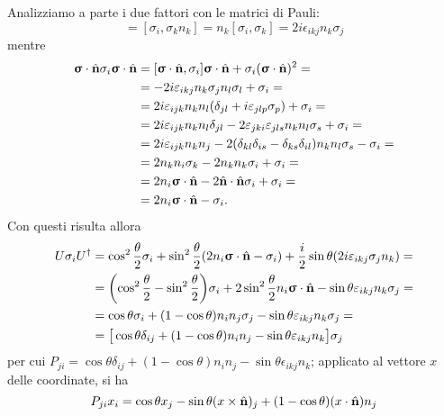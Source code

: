 Analizziamo a parte i due fattori con le matrici di Pauli:
\begin{equation}
	[\sigma_i,\scalar{\vsigma}{\axis}]=[\sigma_i,\sigma_kn_k]=n_k[\sigma_i,\sigma_k]=2i\epsilon_{ikj}n_k\sigma_j
\end{equation}
mentre
\begin{equation}
	\begin{split}
		{\bm{\upsigma}}\cdot{\hat{\mathbf{n}}}\sigma_i{\bm{\upsigma}}\cdot{\hat{\mathbf{n}}}&=[{\bm{\upsigma}}\cdot{\hat{\mathbf{n}}},\sigma_i]{\bm{\upsigma}}\cdot{\hat{\mathbf{n}}}+\sigma_i({\bm{\upsigma}}\cdot{\hat{\mathbf{n}}})^2=\\
		&=-2i\varepsilon_{ikj}n_k\sigma_jn_l\sigma_l+\sigma_i=\\
		&=2i\varepsilon_{ijk}n_kn_l(\delta_{jl}+i\varepsilon_{jlp}\sigma_p)+\sigma_i=\\
		&=2i\varepsilon_{ijk}n_kn_l\delta_{jl}-2\varepsilon_{jki}\varepsilon_{jls}n_kn_l\sigma_s+\sigma_i=\\
		&=2i\varepsilon_{ijk}n_kn_j-2(\delta_{kl}\delta_{is}-\delta_{ks}\delta_{il})n_kn_l\sigma_s-\sigma_i=\\
		&=2n_kn_i\sigma_k-2n_kn_k\sigma_i+\sigma_i=\\
		&=2n_i{\bm{\upsigma}}\cdot{\hat{\mathbf{n}}}-2{\hat{\mathbf{n}}}\cdot{\hat{\mathbf{n}}}\sigma_i+\sigma_i=\\
		&=2n_i{\bm{\upsigma}}\cdot{\hat{\mathbf{n}}}-\sigma_i.
	\end{split}
\end{equation}
Con questi risulta allora
\begin{equation}
	\begin{split}
		U\sigma_iU^\dagger&=\cos^2\frac{\theta}2\sigma_i+\sin^2\frac{\theta}2(2n_i{\bm{\upsigma}}\cdot{\hat{\mathbf{n}}}-\sigma_i)+\frac{i}2\sin\theta(2i\varepsilon_{ikj}\sigma_jn_k)=\\
		&=\bigg(\!\cos^2\frac{\theta}2-\sin^2\frac{\theta}2\bigg)\sigma_i+2\sin^2\frac{\theta}2n_i{\bm{\upsigma}}\cdot{\hat{\mathbf{n}}}-\sin\theta\varepsilon_{ikj}n_k\sigma_j=\\
		&=\cos\theta\sigma_i+(1-\cos\theta)n_in_j\sigma_j-\sin\theta\varepsilon_{ikj}n_k\sigma_j=\\
		&=\big[\cos\theta\delta_{ij}+(1-\cos\theta)n_in_j-\sin\theta\varepsilon_{ikj}n_k\big]\sigma_j
	\end{split}
\end{equation}
per cui $P_{ji}=\cos\theta\delta_{ij}+(1-\cos\theta)n_in_j-\sin\theta\epsilon_{ikj}n_k$; applicato al vettore $x$ delle coordinate, si ha
\begin{equation}
	P_{ji}x_i=\cos\theta x_j-\sin\theta(x\times\hat{\mathbf{n}})_j+(1-\cos\theta)({x}\cdot{\hat{\mathbf{n}}})n_j
\end{equation}
